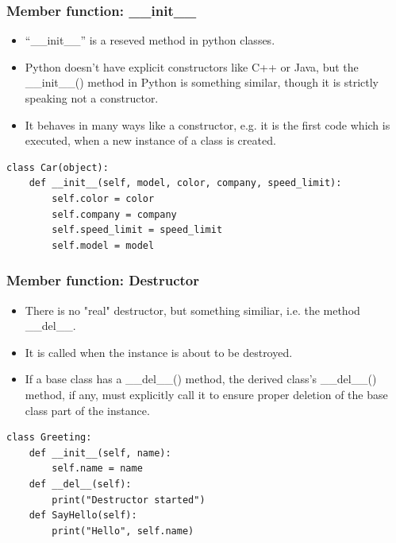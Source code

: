 \begin{frame}[fragile]\frametitle{Member function: \_\_init\_\_}
   \begin{itemize}
  \item ``\_\_init\_\_'' is a reseved method in python classes. 
  \item Python doesn't have explicit constructors like C++ or Java, but the \_\_init\_\_() method in Python is something similar, though it is strictly speaking not a constructor. 
  \item It behaves in many ways like a constructor, e.g. it is the first code which is executed, when a new instance of a class is created.
   \end{itemize}
   
\begin{lstlisting}
class Car(object):
	def __init__(self, model, color, company, speed_limit):
		self.color = color
		self.company = company
		self.speed_limit = speed_limit
		self.model = model

\end{lstlisting}

\end{frame}

\begin{frame}[fragile]\frametitle{Member function: Destructor}
   \begin{itemize}
  \item There is no "real" destructor, but something similiar, i.e. the method \_\_del\_\_. 
  \item It is called when the instance is about to be destroyed. 
  \item If a base class has a \_\_del\_\_() method, the derived class's \_\_del\_\_() method, if any, must explicitly call it to ensure proper deletion of the base class part of the instance. 
   \end{itemize}
   
   
\begin{lstlisting}
class Greeting:
    def __init__(self, name):
        self.name = name
    def __del__(self):
        print("Destructor started")
    def SayHello(self):
        print("Hello", self.name)

\end{lstlisting}   
\end{frame}

